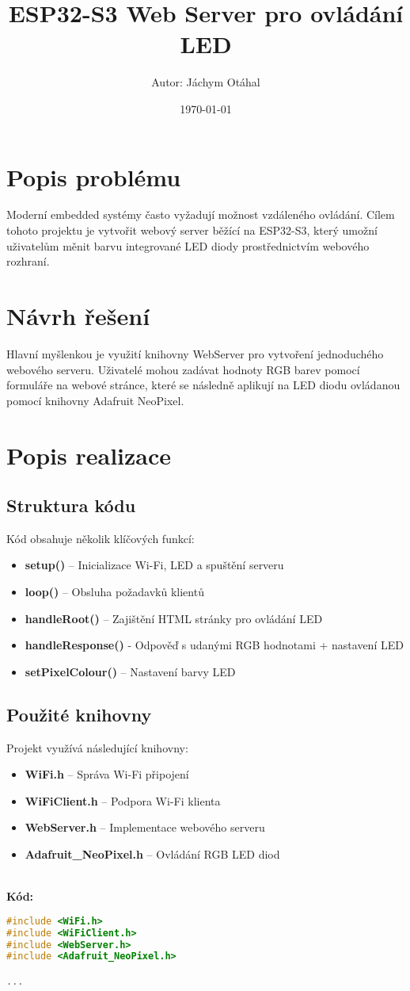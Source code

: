 \documentclass{article}
\title{ESP32-S3 Web Server pro ovládání LED}
\author{Autor: Jáchym Otáhal}
\date{\today}
\begin{document}
\maketitle

\section{Popis problému}
Moderní embedded systémy často vyžadují možnost vzdáleného ovládání. Cílem tohoto projektu je vytvořit webový server běžící na ESP32-S3, který umožní uživatelům měnit barvu integrované LED diody prostřednictvím webového rozhraní.

\section{Návrh řešení}
Hlavní myšlenkou je využití knihovny WebServer pro vytvoření jednoduchého webového serveru. Uživatelé mohou zadávat hodnoty RGB barev pomocí formuláře na webové stránce, které se následně aplikují na LED diodu ovládanou pomocí knihovny Adafruit NeoPixel.

\section{Popis realizace}
\subsection{Struktura kódu}
Kód obsahuje několik klíčových funkcí:
\begin{itemize}
    \item \textbf{setup()} – Inicializace Wi-Fi, LED a spuštění serveru
    \item \textbf{loop()} – Obsluha požadavků klientů
    \item \textbf{handleRoot()} – Zajištění HTML stránky pro ovládání LED
    \item \textbf{handleResponse()} - Odpověď s udanými RGB hodnotami + nastavení LED
    \item \textbf{setPixelColour()} – Nastavení barvy LED
\end{itemize}

\subsection{Použité knihovny}
Projekt využívá následující knihovny:
\begin{itemize}
    \item \textbf{WiFi.h} – Správa Wi-Fi připojení
    \item \textbf{WiFiClient.h} – Podpora Wi-Fi klienta
    \item \textbf{WebServer.h} – Implementace webového serveru
    \item \textbf{Adafruit\_NeoPixel.h} – Ovládání RGB LED diod
\end{itemize}
\\
\textbf{Kód:}
\begin{lstlisting}[language=C++]
#include <WiFi.h>
#include <WiFiClient.h>
#include <WebServer.h>
#include <Adafruit_NeoPixel.h> 

...
\end{lstlisting}
\end{document}
